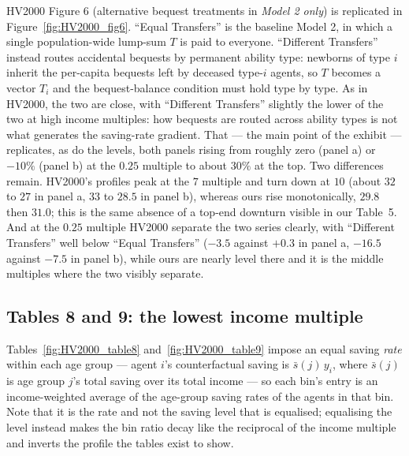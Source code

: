 \documentclass[11pt,fleqn]{article}
\begin{document}
HV2000 Figure 6 (alternative bequest treatments in \emph{Model 2 only}) is replicated in Figure~\ref{fig:HV2000_fig6}. ``Equal Transfers'' is the baseline Model 2, in which a single population-wide lump-sum $T$ is paid to everyone. ``Different Transfers'' instead routes accidental bequests by permanent ability type: newborns of type $i$ inherit the per-capita bequests left by deceased type-$i$ agents, so $T$ becomes a vector $T_i$ and the bequest-balance condition must hold type by type. As in HV2000, the two are close, with ``Different Transfers'' slightly the lower of the two at high income multiples: how bequests are routed across ability types is not what generates the saving-rate gradient. That --- the main point of the exhibit --- replicates, as do the levels, both panels rising from roughly zero (panel a) or $-10\%$ (panel b) at the $0.25$ multiple to about $30\%$ at the top. Two differences remain. HV2000's profiles peak at the $7$ multiple and turn down at $10$ (about $32$ to $27$ in panel a, $33$ to $28.5$ in panel b), whereas ours rise monotonically, $29.8$ then $31.0$; this is the same absence of a top-end downturn visible in our Table~5. And at the $0.25$ multiple HV2000 separate the two series clearly, with ``Different Transfers'' well below ``Equal Transfers'' ($-3.5$ against $+0.3$ in panel a, $-16.5$ against $-7.5$ in panel b), while ours are nearly level there and it is the middle multiples where the two visibly separate.



\subsection*{Tables 8 and 9: the lowest income multiple}

Tables~\ref{fig:HV2000_table8} and~\ref{fig:HV2000_table9} impose an equal saving \emph{rate} within each age group --- agent $i$'s counterfactual saving is $\bar{s}(j)\,y_i$, where $\bar{s}(j)$ is age group $j$'s total saving over its total income --- so each bin's entry is an income-weighted average of the age-group saving rates of the agents in that bin. Note that it is the rate and not the saving level that is equalised; equalising the level instead makes the bin ratio decay like the reciprocal of the income multiple and inverts the profile the tables exist to show.
\end{document}
